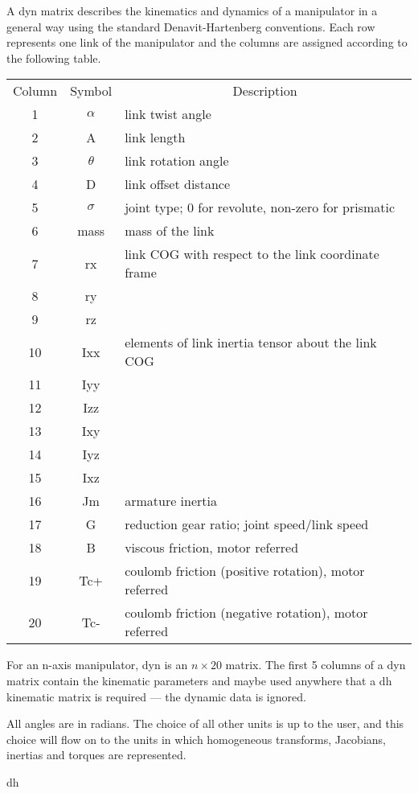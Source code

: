 \documentclass{article}
\newcommand{\mdes}[1]{\hskip -1.25in 
{\hbox{\makebox[1.25in][l]{\Refon Description}}}{#1}\vskip 0.25in}
\newcommand{\msa}[1]{\hskip -1.25in 
{\hbox{\makebox[1.25in][l]{\Refon See Also}}}{#1}\vskip 0.25in}
\newcommand{\var}[1]{{\vtt #1}}
\renewcommand{\hom}{homogeneous transform}
\begin{document}
\mdes{A \var{dyn} matrix describes the
kinematics and dynamics of a manipulator in a general way using the standard
Denavit-Hartenberg conventions.
Each row represents one link of the manipulator and the columns are assigned
according to the following table.

\begin{center}
\begin{tabular}{ccl}
Column & Symbol & \multicolumn{1}{c}{Description}\\
1 & $\alpha$ & link twist angle \\
2 & A & link length \\
3 & $\theta$ & link rotation angle \\
4 & D & link offset distance \\
5 & $\sigma$ & joint type; 0 for revolute, non-zero for prismatic \\
6 & mass & mass of the link \\
7 & rx & link COG with respect to the link coordinate frame \\
8 & ry \\
9 & rz \\
10 & Ixx & elements of link inertia tensor about the link COG \\
11 & Iyy \\
12 & Izz \\
13 & Ixy \\
14 & Iyz \\
15 & Ixz \\
16 & Jm & armature inertia \\
17 & G & reduction gear ratio; joint speed/link speed \\
18 & B & viscous friction, motor referred\\
19 & Tc+ & coulomb friction (positive rotation), motor referred\\
20 & Tc- &     coulomb friction (negative rotation), motor referred\\
\end{tabular}
\end{center}

For an n-axis manipulator, \var{dyn} is an $n \times 20$ matrix.
The first 5 columns of a \var{dyn} matrix contain the kinematic parameters
and maybe used anywhere that a \var{dh} kinematic matrix is required --- the
dynamic data is ignored.
}

All angles are in radians.
The choice of all other units is up to the user, and this choice will flow
on to the units in which \hom s, Jacobians, inertias and torques
are represented.

\msa{dh}
\vfil\eject 


\cleardoublepage
\end{document}
